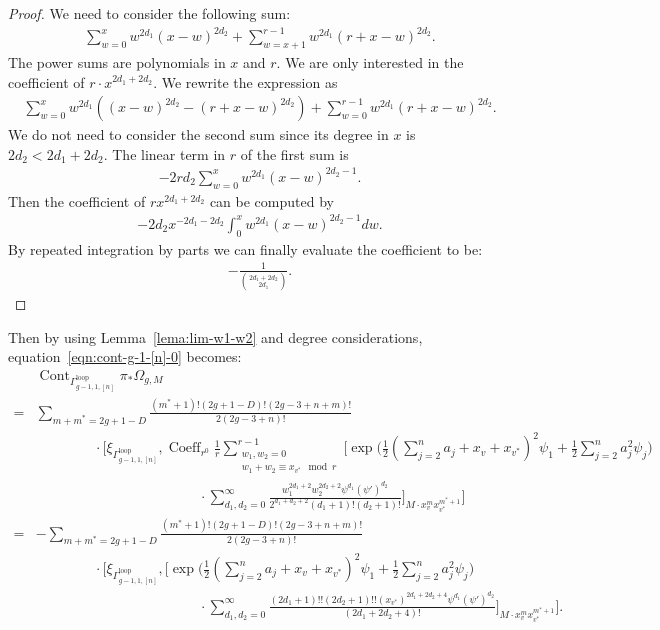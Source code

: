 \documentclass[12pt,reqno]{amsart}
\DeclareMathOperator{\Cont}{Cont}
\DeclareMathOperator{\Coeff}{Coeff}
\newcommand{\Gammaloop}{\Gamma^\mathrm{loop}}
\theoremstyle{plain}
\theoremstyle{definition}
\theoremstyle{remark}
\begin{document}
\begin{proof}
We need to consider the following sum:
\begin{align*}
\sum_{w=0}^{x}w^{2d_1}(x-w)^{2d_2}  +\sum_{w=x+1}^{r-1}w^{2d_1}(r+x-w)^{2d_2}.  
\end{align*}
The power sums are polynomials in $x$ and $r$. We are only interested in the
coefficient of $r\cdot x^{2d_1+2d_2}$.
We rewrite the expression as
\begin{align*}
\sum_{w=0}^{x}w^{2d_1}((x-w)^{2d_2}-(r+x-w)^{2d_2})  +\sum_{w=0}^{r-1}w^{2d_1}(r+x-w)^{2d_2}.  
\end{align*}
We do not need to consider the second sum since its degree in $x$ is $2d_2 < 2d_1 + 2d_2$.
The linear term in $r$ of the first sum is
\begin{align*}
-2r d_2\sum_{w=0}^{x}w^{2d_1}(x-w)^{2d_2-1}.    
\end{align*}
Then the coefficient of $r x^{2d_1+2d_2}$ can be computed by
\begin{align*}
-2d_2 x^{-2d_1-2d_2}
\int_{0}^{x}w^{2d_1}(x-w)^{2d_2-1} dw.
\end{align*}
By repeated integration by parts we can finally evaluate the coefficient to be:
\begin{align*}
-\frac{1}{\binom{2d_1+2d_2}{2d_1}}   .
\end{align*}
\end{proof}

Then by using Lemma~\ref{lema:lim-w1-w2} and degree considerations, equation~\eqref{eqn:cont-g-1-[n]-0} becomes:
\begin{align}\label{eqn:cont-ga-g-1[n]0}
&\Cont_{\Gammaloop_{g-1,1,[n]}}\pi_*\Omega_{g,M}
\nonumber\\=&\sum_{m+m^*=2g+1-D}
\frac{(m^*+1)!(2g+1-D)!(2g-3+n+m)!}{2(2g-3+n)!}
\nonumber\\&\hspace{50pt}\cdot\Bigg[\xi_{\Gammaloop_{g-1,1,[n]}},\Coeff_{r^0}\frac{1}{r}\sum_{\substack{w_1,w_2=0\\w_1+w_2\equiv x_{v^*} \mod r}}^{r-1}\Bigg[\exp\Big(\frac{1}{2}(\sum_{j=2}^{n}a_j+x_v+x_{v^*})^2\psi_1+\frac{1}{2}\sum_{j=2}^{n}a_j^2\psi_j\Big)
\nonumber\\&\hspace{140pt}\cdot\sum_{d_1,d_2=0}^{\infty}\frac{w_1^{2d_1+2}w_2^{2d_2+2}\psi^{d_1}(\psi')^{d_2}}{2^{d_1+d_2+2}(d_1+1)!(d_2+1)!}\Bigg]_{M\cdot x_v^{m}x_{v^*}^{m^*+1}}\Bigg]
\nonumber\\=&-\sum_{m+m^*=2g+1-D}
\frac{(m^*+1)!(2g+1-D)!(2g-3+n+m)!}{2(2g-3+n)!}
\nonumber\\&\hspace{50pt}\cdot\Bigg[\xi_{\Gammaloop_{g-1,1,[n]}},\Bigg[\exp\Big(\frac{1}{2}(\sum_{j=2}^{n}a_j+x_v+x_{v^*})^2\psi_1+\frac{1}{2}\sum_{j=2}^{n}a_j^2\psi_j\Big)
\nonumber\\&\hspace{140pt}\cdot\sum_{d_1,d_2=0}^{\infty}\frac{(2d_1+1)!!(2d_2+1)!!(x_{v^*})^{2d_1+2d_2+4}\psi^{d_1}(\psi')^{d_2}}{(2d_1+2d_2+4)!}\Bigg]_{M\cdot x_v^{m}x_{v^*}^{m^*+1}}\Bigg].
\end{align}
\end{document}
